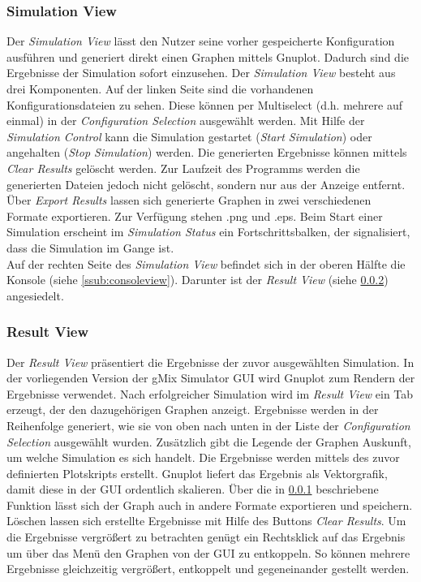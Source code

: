 \documentclass[a4paper, 11pt]{article} %
\begin{document}
\subsubsection{Simulation View} %
\label{ssub:simulationview}
Der \emph{Simulation View} lässt den Nutzer seine vorher gespeicherte Konfiguration ausführen und generiert direkt einen Graphen mittels Gnuplot. Dadurch sind die Ergebnisse der Simulation sofort einzusehen. Der \emph{Simulation View} besteht aus drei Komponenten. Auf der linken Seite sind die vorhandenen Konfigurationsdateien zu sehen. Diese können per Multiselect (d.h. mehrere auf einmal) in der \emph{Configuration Selection} ausgewählt werden. Mit Hilfe der \emph{Simulation Control} kann die Simulation gestartet (\emph{Start Simulation}) oder angehalten (\emph{Stop Simulation}) werden. Die generierten Ergebnisse können mittels \emph{Clear Results} gelöscht werden. Zur Laufzeit des Programms werden die generierten Dateien jedoch nicht gelöscht, sondern nur aus der Anzeige entfernt. Über \emph{Export Results} lassen sich generierte Graphen in zwei verschiedenen Formate exportieren. Zur Verfügung stehen .png und .eps. Beim Start einer Simulation erscheint im \emph{Simulation Status} ein Fortschrittsbalken, der signalisiert, dass die Simulation im Gange ist. \\

Auf der rechten Seite des \emph{Simulation View} befindet sich in der oberen Hälfte die Konsole (siehe \ref{ssub:consoleview}). Darunter ist der \emph{Result View} (siehe \ref{ssub:resultview}) angesiedelt.

\subsubsection{Result View} %
\label{ssub:resultview}
Der \emph{Result View} präsentiert die Ergebnisse der zuvor ausgewählten Simulation. In der vorliegenden Version der gMix Simulator GUI wird Gnuplot zum Rendern der Ergebnisse verwendet. Nach erfolgreicher Simulation wird im \emph{Result View} ein Tab erzeugt, der den dazugehörigen Graphen anzeigt. Ergebnisse werden in der Reihenfolge generiert, wie sie von oben nach unten in der Liste der \emph{Configuration Selection} ausgewählt wurden. Zusätzlich gibt die Legende der Graphen Auskunft, um welche Simulation es sich handelt. Die Ergebnisse werden mittels des zuvor definierten Plotskripts erstellt. Gnuplot liefert das Ergebnis als Vektorgrafik, damit diese in der GUI ordentlich skalieren. Über die in \ref{ssub:simulationview} beschriebene Funktion lässt sich der Graph auch in andere Formate exportieren und speichern. Löschen lassen sich erstellte Ergebnisse mit Hilfe des Buttons \emph{Clear Results}. Um die Ergebnisse vergrößert zu betrachten genügt ein Rechtsklick auf das Ergebnis um über das Menü den Graphen von der GUI zu entkoppeln. So können mehrere Ergebnisse gleichzeitig vergrößert, entkoppelt und gegeneinander gestellt werden. 
\end{document}
